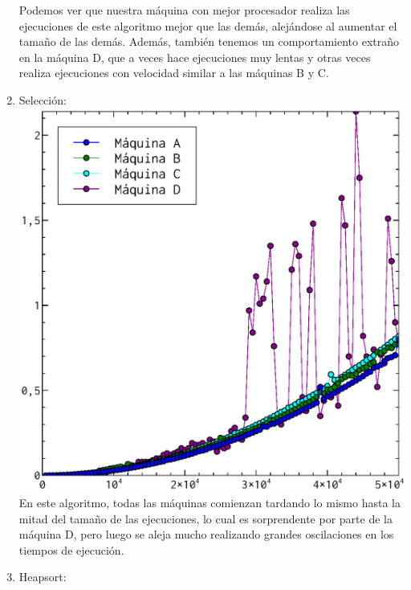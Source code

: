 \documentclass[a4paper, 11pt]{article}
\begin{document}
\begin{enumerate}
  Podemos ver que nuestra máquina con mejor procesador realiza las ejecuciones de este algoritmo mejor que las demás, alejándose al aumentar el tamaño de las demás. Además, también tenemos un comportamiento extraño en la máquina D, que a veces hace ejecuciones muy lentas y otras veces realiza ejecuciones con velocidad similar a las máquinas B y C.
  \item Selección:\\
  \includegraphics[scale=0.5]{seleccion_todos.eps}\\
  En este algoritmo, todas las máquinas comienzan tardando lo mismo hasta la mitad del tamaño de las ejecuciones, lo cual es sorprendente por parte de la máquina D, pero luego se aleja mucho realizando grandes oscilaciones en los tiempos de ejecución.
  \item Heapsort:\\

\end{enumerate}
\end{document}
